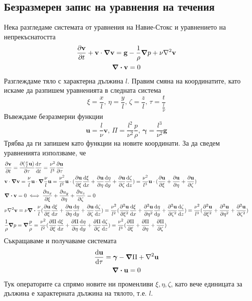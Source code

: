 \documentclass[bulgarian, 12pt]{article}
\begin{document}
\subsection{Безразмерен запис на уравнения на течения}
Нека разгледаме системата от уравнения на Навие-Стокс и уравнението на непрекъснатостта
\begin{gather}
	\pdv{\mathbf{v}}{t} + \mathbf{v} \cdot \grad \mathbf{v} = \mathbf{g} - \frac{1}{\rho}\grad p + \nu \laplacian \mathbf{v} \\\nonumber
	\div \mathbf{v} = 0
\end{gather}
Разглеждаме тяло с характерна дължина $l$. Правим смяна на координатите, като искаме да разпишем уравненията в следната система
\begin{equation}
	\xi = \frac{x}{l},\, \eta = \frac{y}{l},\, \zeta = \frac{z}{l},\, \tau = \frac{t}{\frac{l}{\nu}}
\end{equation}
Въвеждаме безразмерни функции
\begin{equation}
	\mathbf{u} = \frac{l}{\nu} \mathbf{v},\, \Pi = \frac{l^2}{\nu^2} \frac{p}{\rho},\, \bm{\gamma} = \frac{l^3}{\nu^2} \mathbf{g}
\end{equation}
Трябва да ги запишем като функции на новите координати. За да сведем уравненията използваме, че
\begin{align}
	&\pdv{\mathbf{v}}{t} = \pdv{(\frac{\nu}{l}\mathbf{u})}{\tau}\dv{\tau}{t} = \frac{\nu^2}{l^3} \pdv{\mathbf{u}}{\tau} \\
	&\mathbf{v} \cdot \grad \mathbf{v} = 
		\frac{\nu}{l} \mathbf{u} \cdot \grad \frac{\nu}{l} \mathbf{u} = 
		\frac{\nu^2}{l^2} \mathbf{u} \cdot (\pdv{\mathbf{u}}{\xi}\dv{\xi}{x} + \pdv{\mathbf{u}}{\eta}\dv{\eta}{y} + \pdv{\mathbf{u}}{\zeta}\dv{\zeta}{z}) =
		\frac{\nu^2}{l^3} \mathbf{u} \cdot (\pdv{\mathbf{u}}{\xi} + \pdv{\mathbf{u}}{\eta} + \pdv{\mathbf{u}}{\zeta}) \\
	& \div \mathbf{v} = 0 \iff \pdv{u_x}{\xi} + \pdv{u_y}{\eta} + \pdv{u_z}{\zeta} = 0 \\
	& \nu \laplacian \mathbf{v} = 
		\nu \div \frac{\nu}{l} (\pdv{\mathbf{u}}{\xi}\dv{\xi}{x} + \pdv{\mathbf{u}}{\eta}\dv{\eta}{y} + \pdv{\mathbf{u}}{\zeta}\dv{\zeta}{z}) = 
		\frac{\nu^2}{l^2} (\pdv[2]{\mathbf{u}}{\xi}\dv{\xi}{x} + \pdv[2]{\mathbf{u}}{\eta}\dv{\eta}{y} + \pdv[2]{\mathbf{u}}{\zeta}\dv{\zeta}{z}) =
		\frac{\nu^2}{l^3} (\pdv[2]{\mathbf{u}}{\xi} + \pdv[2]{\mathbf{u}}{\eta} + \pdv[2]{\mathbf{u}}{\zeta}) \\
	&\frac{1}{\rho}\grad p = 
		\grad \frac{p}{\rho} =
	 	\frac{\nu^2}{l^2} (\pdv{\Pi}{\xi}\dv{\xi}{x} + \pdv{\Pi}{\eta}\dv{\eta}{y} + \pdv{\Pi}{\zeta}\dv{\zeta}{z}) =
		\frac{\nu^2}{l^3} (\pdv{\Pi}{\xi} + \pdv{\Pi}{\eta} + \pdv{\Pi}{\zeta})
\end{align}
Съкращаваме и получаваме системата
\begin{gather}
	\dv{\mathbf{u}}{\tau} = \bm{\gamma} - \grad \Pi + \laplacian \mathbf{u} \\\nonumber
	\div \mathbf{u} = 0
\end{gather}
Тук операторите са спрямо новите ни променливи $\xi, \eta, \zeta$, като вече единицата за дължина е характерната дължина на тялото, т.е. $l$.
\end{document}
